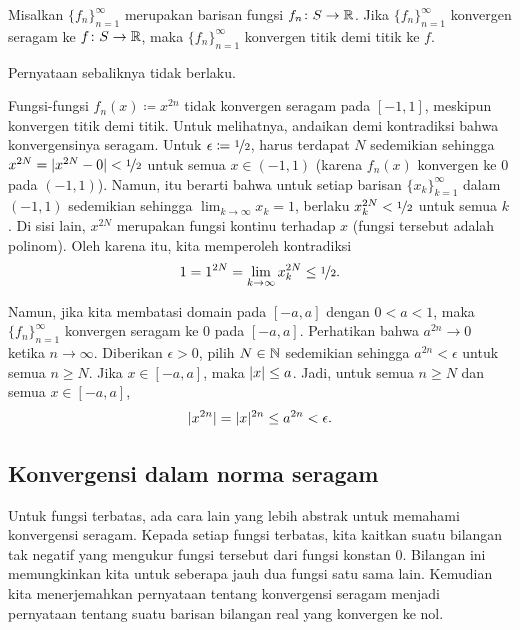\begin{prop}
Misalkan $\{ f_n \}_{n=1}^\infty$ merupakan barisan fungsi $f_n \colon S \to {\mathbb{R}}$.
Jika $\{ f_n \}_{n=1}^\infty$ konvergen
seragam ke $f \colon S \to {\mathbb{R}}$, maka $\{ f_n \}_{n=1}^\infty$ konvergen titik demi titik ke $f$.
\end{prop}

Pernyataan sebaliknya tidak berlaku.

\begin{example}
Fungsi-fungsi $f_n(x) \coloneqq x^{2n}$ tidak konvergen seragam pada $[-1,1]$,
meskipun konvergen titik demi titik.  Untuk melihatnya, andaikan demi kontradiksi
bahwa konvergensinya seragam.  Untuk $\epsilon \coloneqq \nicefrac{1}{2}$, harus
terdapat $N$ sedemikian sehingga $x^{2N} = \lvert {x^{2N} - 0} \rvert < \nicefrac{1}{2}$ untuk semua $x \in
(-1,1)$ (karena $f_n(x)$ konvergen ke 0 pada $(-1,1)$).  Namun, itu berarti bahwa
untuk setiap barisan $\{ x_k \}_{k=1}^\infty$ dalam $(-1,1)$ sedemikian sehingga $\lim_{k\to\infty} x_k = 1$,
berlaku $x_k^{2N} < \nicefrac{1}{2}$ untuk semua $k$.  Di sisi lain,
$x^{2N}$ merupakan fungsi kontinu terhadap $x$ (fungsi tersebut adalah polinom).  Oleh karena itu,
kita memperoleh kontradiksi
\begin{equation*}
1 = 1^{2N}  = \lim_{k\to\infty} x_k^{2N} \leq \nicefrac{1}{2} .
\end{equation*}

Namun, jika kita membatasi domain pada $[-a,a]$ dengan $0 < a < 1$, maka
$\{ f_n \}_{n=1}^\infty$ konvergen seragam ke 0 pada $[-a,a]$.  Perhatikan bahwa
$a^{2n} \to 0$ ketika $n \to \infty$.  Diberikan $\epsilon > 0$,
pilih $N \in {\mathbb{N}}$ sedemikian sehingga
$a^{2n} < \epsilon$ untuk semua $n \geq N$.
Jika $x \in [-a,a]$, maka
$\lvert {x} \rvert \leq a$.  Jadi,
untuk semua $n \geq N$ dan semua $x \in [-a,a]$,
\begin{equation*}
\lvert {x^{2n}} \rvert = \lvert {x} \rvert^{2n} \leq a^{2n} < \epsilon .
\end{equation*}
\end{example}

\subsection{Konvergensi dalam norma seragam}

Untuk fungsi terbatas, ada cara lain yang lebih abstrak untuk
memahami konvergensi seragam.  Kepada setiap fungsi terbatas, kita kaitkan
suatu bilangan tak negatif yang
mengukur  fungsi tersebut dari fungsi konstan
$0$.
Bilangan ini memungkinkan kita untuk
seberapa jauh dua fungsi satu sama lain.  Kemudian kita menerjemahkan
pernyataan tentang konvergensi seragam menjadi pernyataan tentang suatu
barisan bilangan real yang konvergen ke nol.

